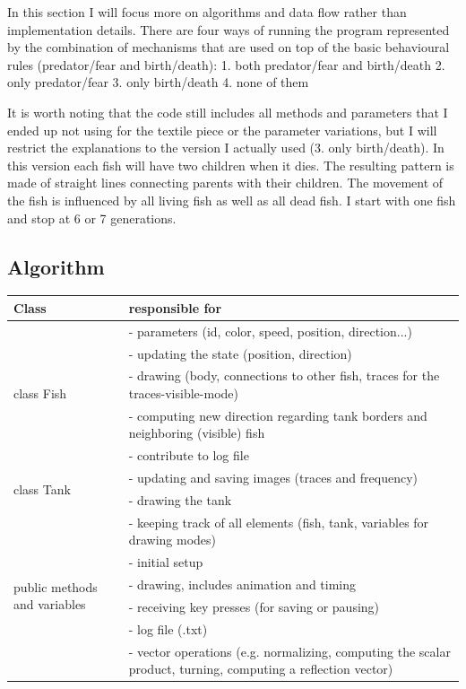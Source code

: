 \documentclass{scrartcl}
\begin{document}
In this section I will focus more on algorithms and data flow rather than implementation details.
There are four ways of running the program represented by the combination of mechanisms that are used on top of the basic behavioural rules (predator/fear and birth/death):
1. both predator/fear and birth/death
2. only predator/fear
3. only birth/death
4. none of them

It is worth noting that the code still includes all methods and parameters that I ended up not using for the textile piece or the parameter variations, but I will restrict the explanations to the version I actually used (3. only birth/death).
In this version each fish will have two children when it dies. The resulting pattern is made of straight lines connecting parents with their children. The movement of the fish is influenced by all living fish as well as all dead fish. I start with one fish and stop at 6 or 7 generations.

\subsection{Algorithm}

\begin{tabular}{ p{} | p{} }                    
  Class & responsible for \\
  \hline \hline
  \multirow{5}{*}{class Fish}
  		& - parameters (id, color, speed, position, direction...) \\
  		& - updating the state (position, direction)\\
  		& - drawing (body, connections to other fish, traces for the traces-visible-mode)\\
  		& - computing new direction regarding tank borders and neighboring (visible) fish\\
  		& - contribute to log file\\
  \hline
  \multirow{2}{*}{class Tank}
  		& - updating and saving images (traces and frequency)\\
  		& - drawing the tank\\
  \hline
  \multirow{6}{*}{public methods and variables}
  		& - keeping track of all elements (fish, tank, variables for drawing modes)\\
  		& - initial setup\\
  		& - drawing, includes animation and timing\\
	  	& - receiving key presses (for saving or pausing)\\
	  	& - log file (.txt)\\
	  	& - vector operations (e.g. normalizing, computing the scalar product, turning, computing a reflection vector)\\
  
  \hline  
\end{tabular}
\end{document}
